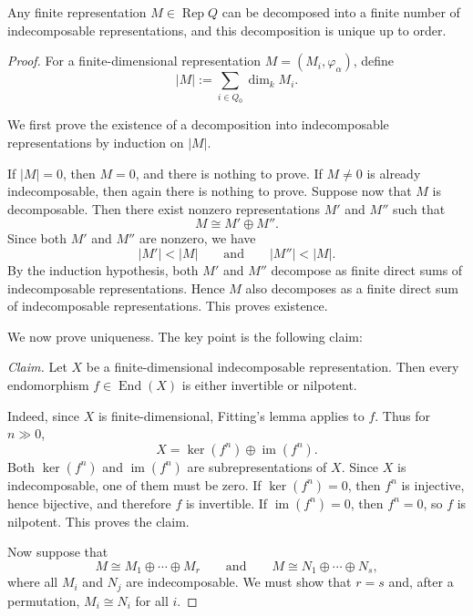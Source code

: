 \documentclass[11pt, a4paper]{report}
\begin{document}
\begin{theorem}
    Any finite representation $M \in \operatorname{Rep}Q$ can be decomposed into a finite number of indecomposable representations, and this decomposition is unique up to order.
\end{theorem}

\begin{proof}
    For a finite-dimensional representation \(M=(M_i,\varphi_\alpha)\), define
    \[
        |M|:=\sum_{i\in Q_0}\dim_k M_i.
    \]

    We first prove the existence of a decomposition into indecomposable representations by induction on \(|M|\).

    If \(|M|=0\), then \(M=0\), and there is nothing to prove. If \(M\neq 0\) is already indecomposable, then again there is nothing to prove. Suppose now that \(M\) is decomposable. Then there exist nonzero representations \(M'\) and \(M''\) such that
    \[
        M \cong M' \oplus M''.
    \]
    Since both \(M'\) and \(M''\) are nonzero, we have
    \[
        |M'|<|M| \qquad \text{and} \qquad |M''|<|M|.
    \]
    By the induction hypothesis, both \(M'\) and \(M''\) decompose as finite direct sums of indecomposable representations. Hence \(M\) also decomposes as a finite direct sum of indecomposable representations. This proves existence.

    We now prove uniqueness. The key point is the following claim:

    \medskip

    \noindent \emph{Claim.} Let \(X\) be a finite-dimensional indecomposable representation. Then every endomorphism \(f\in \operatorname{End}(X)\) is either invertible or nilpotent.

    \medskip

    Indeed, since \(X\) is finite-dimensional, Fitting's lemma applies to \(f\). Thus for \(n\gg 0\),
    \[
        X=\ker(f^n)\oplus \operatorname{im}(f^n).
    \]
    Both \(\ker(f^n)\) and \(\operatorname{im}(f^n)\) are subrepresentations of \(X\). Since \(X\) is indecomposable, one of them must be zero. If \(\ker(f^n)=0\), then \(f^n\) is injective, hence bijective, and therefore \(f\) is invertible. If \(\operatorname{im}(f^n)=0\), then \(f^n=0\), so \(f\) is nilpotent. This proves the claim.

    \medskip

    Now suppose that
    \[
        M \cong M_1\oplus \cdots \oplus M_r
        \qquad\text{and}\qquad
        M \cong N_1\oplus \cdots \oplus N_s,
    \]
    where all \(M_i\) and \(N_j\) are indecomposable. We must show that \(r=s\) and, after a permutation, \(M_i\cong N_i\) for all \(i\).


\end{proof}
\end{document}
